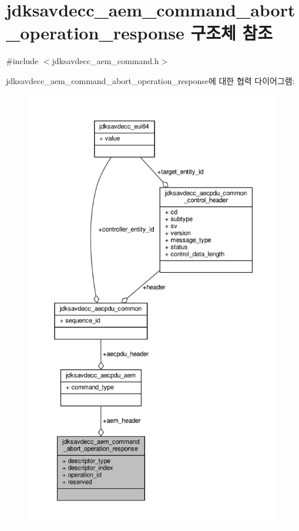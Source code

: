 \hypertarget{structjdksavdecc__aem__command__abort__operation__response}{}\section{jdksavdecc\+\_\+aem\+\_\+command\+\_\+abort\+\_\+operation\+\_\+response 구조체 참조}
\label{structjdksavdecc__aem__command__abort__operation__response}


{\ttfamily \#include $<$jdksavdecc\+\_\+aem\+\_\+command.\+h$>$}



jdksavdecc\+\_\+aem\+\_\+command\+\_\+abort\+\_\+operation\+\_\+response에 대한 협력 다이어그램\+:
\nopagebreak
\begin{figure}[H]
\begin{center}
\leavevmode
\includegraphics[height=550pt]{structjdksavdecc__aem__command__abort__operation__response__coll__graph}
\end{center}
\end{figure}
